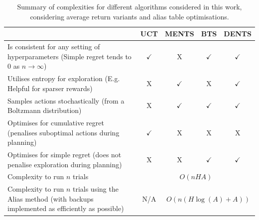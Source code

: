\documentclass{article}
\theoremstyle{plain}
\begin{document}
\begin{appendices}
	    
       
        \begin{table}[]
            \centering
            \begin{tabular}{p{8cm}|c|c|c|c}
                						& UCT      		& MENTS          & BTS               & DENTS \\ 
                \hline
                {Is consistent for any setting of hyperparameters	 \newline (Simple regret tends to 0 as $n\rightarrow\infty$)}
                						& $\checkmark$ 	& X 				& $\checkmark$		& $\checkmark$ 	\\
                \hline
                {Utilises entropy for exploration \newline (E.g. Helpful for sparser rewards)}
                						& X				& $\checkmark$	& X					& $\checkmark$	\\
                \hline
                {Samples actions stochastically \newline(from a Boltzmann distribution)}
                						& X 				& $\checkmark$ 	& $\checkmark$ 		& $\checkmark$	\\
                \hline
                {Optimises for cumulative regret  \newline (penalises suboptimal actions during planning)} 
                						& $\checkmark$	& X 				& X					& X 	\\
                \hline
                	{Optimises for simple regret  \newline (does not penalise exploration during planning)}
                						& X 				& X 				& $\checkmark$ 		& $\checkmark$	\\
                \hline
                	{Complexity to run $n$ trials}	
                						& \multicolumn{4}{c}{$O(nHA)$} 							\\
                \hline
                	{Complexity to run $n$ trials using the Alias method  \newline (with backups implemented as efficiently as possible)}	
                						& N/A 		& \multicolumn{3}{c}{$O(n(H\log(A)+A))$} 			\\
            \end{tabular}
            \caption{Summary of complexities for different algorithms considered in this work, considering average return variants and alias table optimisations. \label{table:compare_algs}}
        \end{table}
		


\end{appendices}
\end{document}
